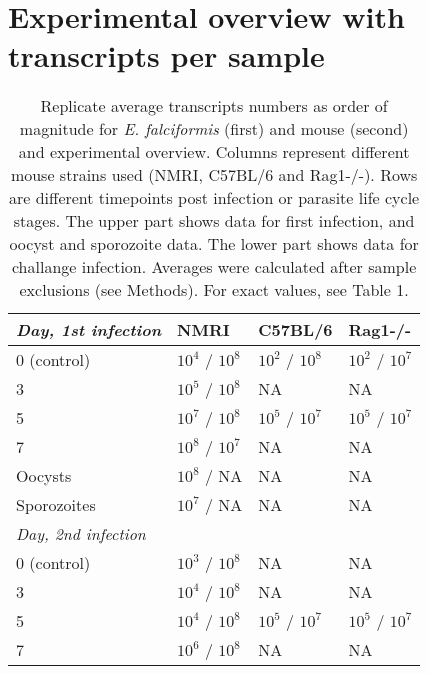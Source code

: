 \documentclass{article}
\begin{document}
\section{Experimental overview with transcripts per sample}
	\setlength{\tabcolsep}{14pt}
	\begin{table}[H]
	\begin{center}
	\caption{Replicate average transcripts numbers as order of magnitude for \textit{E. falciformis}
		(first) and mouse (second) and experimental overview. Columns represent different mouse strains
		used (NMRI, C57BL/6 and Rag1-/-). Rows are different timepoints post infection or parasite life cycle 
		stages. The upper part shows data for first infection, and oocyst and sporozoite data. The lower part 
		shows data for challange infection. Averages were calculated after sample exclusions (see Methods). 
		For exact values, see Table 1.}
\begin{tabular}{*4l}    \toprule
\textit{Day, 1st infection}  	& NMRI  & C57BL/6  & Rag1-/- \\ \midrule
	0 (control)    & $10^4$ / $10^8$  & $10^2$ / $10^8$  & $10^2$ / $10^7$  \\ %
3  		& $10^5$ / $10^8$ & NA  & NA \\ 
5  		& $10^7$ / $10^8$ & $10^5$ / $10^7$  & $10^5$ / $10^7$ \\
7  		& $10^8$ / $10^7$ & NA  & NA \\ 
Oocysts 	& $10^8$ / NA & NA  & NA \\ 
Sporozoites 	& $10^7$ / NA & NA  & NA \\ \midrule

\textit{Day, 2nd infection}  	\\ \midrule
0 (control)     & $10^3$ / $10^8$  &  NA  & NA  \\ %
3  		& $10^4$ / $10^8$ & NA  & NA \\ 
5  		& $10^4$ / $10^8$ & $10^5$ / $10^7$  & $10^5$ / $10^7$ \\
7  		& $10^6$ / $10^8$ & NA  & NA \\ 
	
	
	\bottomrule
 \hline
\end{tabular}
\end{center}
\end{table}


\end{document}
